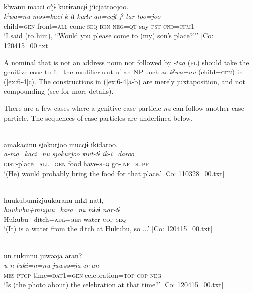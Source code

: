\ex{}\\
{\TM}
\glll  kˀwanu  məəci  cˀjɨ  kurɨrancjɨ  jˀicjattoojoo.\\
\textit{kˀwa=nu}  \textit{məə=kaci}  \textit{k-tɨ}  \textit{kurɨr-an=ccjɨ}  \textit{jˀ-tar-too=joo}\\
child=\textsc{gen}  front=\textsc{all}  come-\textsc{seq}  \textsc{ben}-\textsc{neg}=\textsc{qt}  say-\textsc{pst}-\textsc{cnd}=\textsc{cfm}1\\
\glt ‘I said (to him), “Would you please come to (my) son’s place?”’ [Co: 120415\_00.txt]
\z
\z

A nominal that is not an address noun nor followed by \textit{-taa} (\textsc{pl}) should take the genitive case to fill the modifier slot of an NP such as \textit{kˀwa=nu} (child=\textsc{gen}) in (\ref{ex:6-4}c). The constructions in (\ref{ex:6-4}a-b) are merely juxtaposition, and not compounding (see  for more details).

There are a few cases where a genitive case particle \textit{nu} can follow another case particle. The sequences of case particles are underlined below.

\ea\label{ex:6-5}
\ea{}\\
{\TM}
\glll  amakacinu  {\textbar}sjokurjoo{\textbar}  muccjɨ  ikidaroo.\\
\textit{a-ma=kaci=nu}  \textit{sjokurjoo}  \textit{mut-tɨ}  \textit{ik-i=daroo}\\
\textsc{dist}-place=\textsc{all}=\textsc{gen}  food  have-\textsc{seq}  go-\textsc{inf}=\textsc{supp}\\
\glt ‘(He) would probably bring the food for that place.’ [Co: 110328\_00.txt]

\ex{}\\
{\TM}
\glll  huukubumizjuukaranu  mɨzɨ  natɨ,\\
\textit{huukubu+mizjuu=kara=nu}  \textit{mɨzɨ}  \textit{nar-tɨ}\\
Hukubu+ditch=\textsc{abl}=\textsc{gen}  water  \textsc{cop}-\textsc{seq}\\
\glt ‘(It) is a water from the ditch at Hukubu, so ...’ [Co: 120415\_00.txt]

\ex{}\\
{\TM}
\glll  un  tukinnu  juwəəja  aran?\\
\textit{u-n}  \textit{tuki=n=nu}  \textit{juwəə=ja}  \textit{ar-an}\\
\textsc{mes}-\textsc{ptcp}  time=\textsc{dat}1=\textsc{gen}  celebration=\textsc{top}  \textsc{cop}-\textsc{neg}\\
\glt ‘Is (the photo about) the celebration at that time?’ [Co: 120415\_00.txt]

